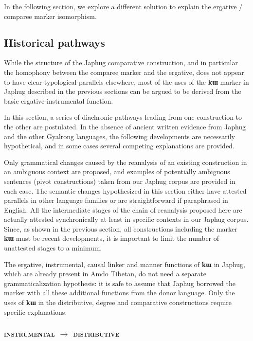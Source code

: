 \documentclass[oldfontcommands,oneside,a4paper,11pt]{article}
\newcommand{\ipa}[1]{{\phon\textbf{#1}}}
\begin{document}
In the following section, we explore a different solution to explain the ergative / comparee marker isomorphism.
 
\subsection{Historical pathways}


While the structure of the Japhug comparative construction, and in particular the homophony between the comparee marker and the ergative, does not appear to have clear typological parallels elsewhere, most of the uses of the \ipa{kɯ} marker in Japhug described in the previous sections can be argued to be derived from the basic ergative-instrumental function. 

In this section, a series of diachronic pathways leading from one construction to the other are postulated. In the absence of ancient written evidence from Japhug and the other Gyalrong languages, the following developments are necessarily hypothetical, and in some cases several competing explanations are provided.

Only grammatical changes caused by the reanalysis of an existing construction in an ambiguous context are proposed, and examples of potentially ambiguous sentences (pivot constructions) taken from our Japhug corpus are provided in each case. The semantic changes hypothesized in this section  either have  attested parallels in other language families or are straightforward if paraphrased in English. All the intermediate stages of the chain of reanalysis proposed here are actually attested synchronically at least in specific contexts in our Japhug corpus. Since, as shown in the previous section, all constructions including the marker \ipa{kɯ} must be recent developments, it is important to limit the number of unattested stages to a minimum.

The ergative, instrumental, causal linker and manner functions of \ipa{kɯ} in Japhug, which are already present in Amdo Tibetan, do not need a separate grammaticalization hypothesis: it is safe to assume that Japhug borrowed the marker with all these additional functions from the donor language. Only the uses of \ipa{kɯ} in the distributive, degree and comparative constructions require specific explanations.

 \subsubsection{\textsc{instrumental} $\rightarrow$ \textsc{distributive} }
  
\end{document}

